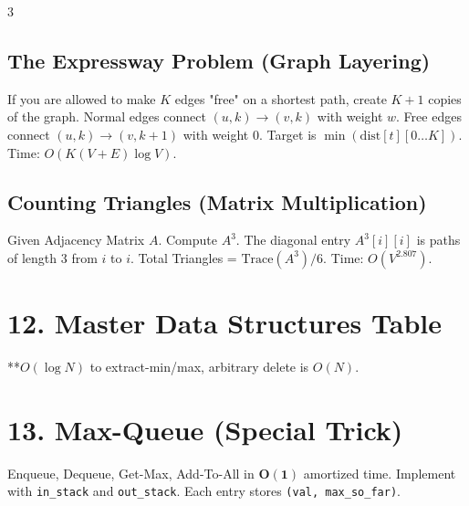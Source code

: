 \documentclass[7pt,landscape]{extarticle}
\begin{document}
\begin{multicols*}{3}
\subsection*{The Expressway Problem (Graph Layering)}
If you are allowed to make $K$ edges "free" on a shortest path, create $K+1$ copies of the graph. Normal edges connect $(u, k) \to (v, k)$ with weight $w$. Free edges connect $(u, k) \to (v, k+1)$ with weight 0. Target is $\min(\text{dist}[t][0 \dots K])$. Time: $O(K(V+E)\log V)$.

\subsection*{Counting Triangles (Matrix Multiplication)}
Given Adjacency Matrix $A$. Compute $A^3$. The diagonal entry $A^3[i][i]$ is paths of length 3 from $i$ to $i$. Total Triangles = $\text{Trace}(A^3) / 6$. Time: $O(V^{2.807})$.

\section*{12. Master Data Structures Table}
\vspace{1pt}
\scriptsize{**$O(\log N)$ to extract-min/max, arbitrary delete is $O(N)$.}

\section*{13. Max-Queue (Special Trick)}
Enqueue, Dequeue, Get-Max, Add-To-All in $\mathbf{O(1)}$ amortized time. Implement with \texttt{in\_stack} and \texttt{out\_stack}. Each entry stores \texttt{(val, max\_so\_far)}. 


\end{multicols*}
\end{document}
